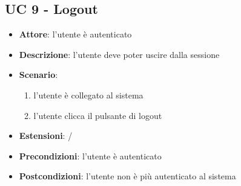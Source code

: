 \subsection{UC 9 - Logout}
\begin{itemize}
    \item \textbf{Attore}: l’utente è autenticato 
    \item \textbf{Descrizione}: l’utente deve poter uscire dalla sessione
    \item \textbf{Scenario}:
        \begin{enumerate}
            \item l’utente è collegato al sistema
            \item l’utente clicca il pulsante di logout
        \end{enumerate}
    \item \textbf{Estensioni}: /
    \item \textbf{Precondizioni}: l’utente è autenticato
    \item \textbf{Postcondizioni}: l’utente non è più autenticato al sistema
\end{itemize}

